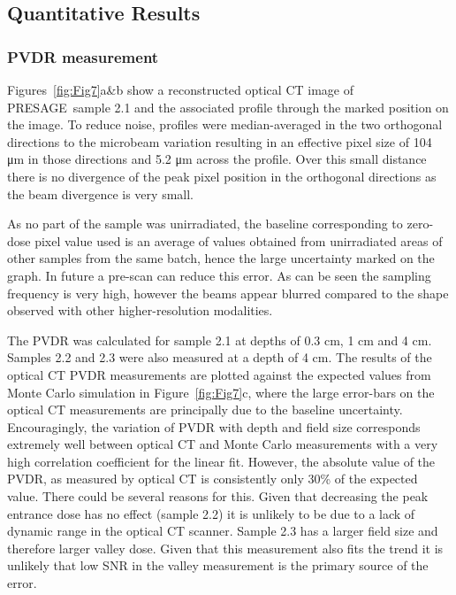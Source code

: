 	\subsection{Quantitative Results}

	
	\subsubsection{PVDR measurement} 
	Figures~\ref{fig:Fig7}a\&b show a reconstructed optical CT image of PRESAGE\textregistered \ sample 2.1 and the associated profile through the marked position on the image. To reduce noise, profiles were median-averaged in the two orthogonal directions to the microbeam variation resulting in an effective pixel size of 104 \si{\um} in those directions and 5.2 \si{\um} across the profile. Over this small distance there is no divergence of the peak pixel position in the orthogonal directions as the beam divergence is very small. 
	
	As no part of the sample was unirradiated, the baseline corresponding to zero-dose pixel value used is an average of values obtained from unirradiated areas of other samples from the same batch, hence the large uncertainty marked on the graph. In future a pre-scan can reduce this error. As can be seen the sampling frequency is very high, however the beams appear blurred compared to the shape observed with other higher-resolution modalities. 
	
	The PVDR was calculated for sample 2.1 at depths of 0.3 cm, 1 cm and 4 cm. Samples 2.2 and 2.3 were also measured at a depth of 4 cm. The results of the optical CT PVDR measurements are plotted against the expected values from Monte Carlo simulation \cite{martinez-roviradevelopment2012} in Figure~\ref{fig:Fig7}c, where the large error-bars on the optical CT measurements are principally due to the baseline uncertainty. Encouragingly, the variation of PVDR with depth and field size corresponds extremely well between optical CT and Monte Carlo measurements with a very high correlation coefficient for the linear fit. However, the absolute value of the PVDR, as measured by optical CT is consistently only 30\% of the expected value. There could be several reasons for this. Given that decreasing the peak entrance dose has no effect (sample 2.2) it is unlikely to be due to a lack of dynamic range in the optical CT scanner. Sample 2.3 has a larger field size and therefore larger valley dose. Given that this measurement also fits the trend it is unlikely that low SNR in the valley measurement is the primary source of the error. 
	
